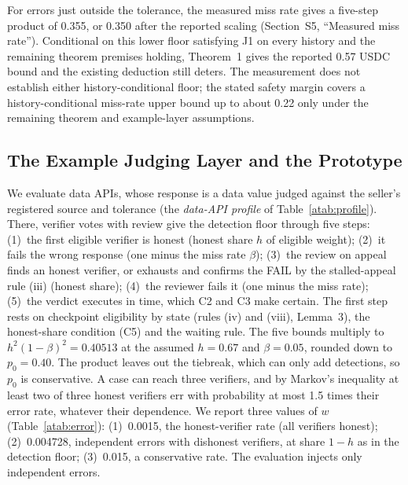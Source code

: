 \documentclass[10pt,a4paper]{article}
\theoremstyle{plain}
\theoremstyle{remark}
\begin{document}
For errors just outside the tolerance, the measured miss rate gives a five-step product of 0.355, or 0.350 after the reported scaling (Section~S5, ``Measured miss rate''). Conditional on this lower floor satisfying J1 on every history and the remaining theorem premises holding, Theorem~1 gives the reported 0.57 USDC bound and the existing deduction still deters. The measurement does not establish either history-conditional floor; the stated safety margin covers a history-conditional miss-rate upper bound up to about 0.22 only under the remaining theorem and example-layer assumptions.


\subsection{The Example Judging Layer and the Prototype}
\label{app:example}
We evaluate data APIs, whose response is a data value judged against the seller's registered source and tolerance (the \emph{data-API profile} of Table~\ref{atab:profile}). There, verifier votes with review give the detection floor through five steps: (1)~the first eligible verifier is honest (honest share $h$ of eligible weight); (2)~it fails the wrong response (one minus the miss rate $\beta$); (3)~the review on appeal finds an honest verifier, or exhausts and confirms the FAIL by the stalled-appeal rule (iii) (honest share); (4)~the reviewer fails it (one minus the miss rate); (5)~the verdict executes in time, which C2 and C3 make certain. The first step rests on checkpoint eligibility by state (rules (iv) and (viii), Lemma~3), the honest-share condition (C5) and the waiting rule. The five bounds multiply to $h^2(1-\beta)^2=0.40513$ at the assumed $h=0.67$ and $\beta=0.05$, rounded down to $p_0=0.40$. The product leaves out the tiebreak, which can only add detections, so $p_0$ is conservative. A case can reach three verifiers, and by Markov's inequality at least two of three honest verifiers err with probability at most 1.5 times their error rate, whatever their dependence. We report three values of $w$ (Table~\ref{atab:error}): (1)~0.0015, the honest-verifier rate (all verifiers honest); (2)~0.004728, independent errors with dishonest verifiers, at share $1-h$ as in the detection floor; (3)~0.015, a conservative rate. The evaluation injects only independent errors.
\end{document}

